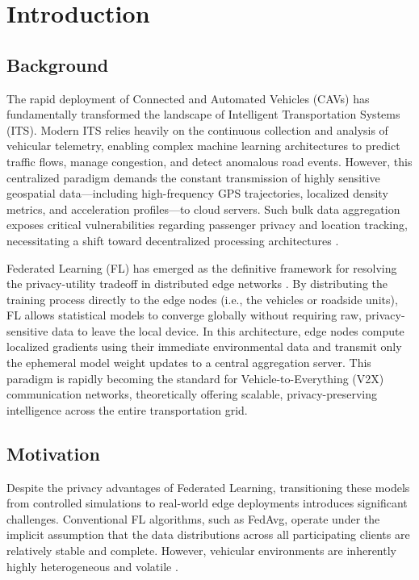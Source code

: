 \section{Introduction}

\subsection{Background}

The rapid deployment of Connected and Automated Vehicles (CAVs) has fundamentally transformed the landscape of Intelligent Transportation Systems (ITS). Modern ITS relies heavily on the continuous collection and analysis of vehicular telemetry, enabling complex machine learning architectures to predict traffic flows, manage congestion, and detect anomalous road events. However, this centralized paradigm demands the constant transmission of highly sensitive geospatial data---including high-frequency GPS trajectories, localized density metrics, and acceleration profiles---to cloud servers. Such bulk data aggregation exposes critical vulnerabilities regarding passenger privacy and location tracking, necessitating a shift toward decentralized processing architectures \cite{zhang2024federated_its}.

Federated Learning (FL) has emerged as the definitive framework for resolving the privacy-utility tradeoff in distributed edge networks \cite{mcmahan2017communication}. By distributing the training process directly to the edge nodes (i.e., the vehicles or roadside units), FL allows statistical models to converge globally without requiring raw, privacy-sensitive data to leave the local device. In this architecture, edge nodes compute localized gradients using their immediate environmental data and transmit only the ephemeral model weight updates to a central aggregation server. This paradigm is rapidly becoming the standard for Vehicle-to-Everything (V2X) communication networks, theoretically offering scalable, privacy-preserving intelligence across the entire transportation grid.

\subsection{Motivation}

Despite the privacy advantages of Federated Learning, transitioning these models from controlled simulations to real-world edge deployments introduces significant challenges. Conventional FL algorithms, such as FedAvg, operate under the implicit assumption that the data distributions across all participating clients are relatively stable and complete. However, vehicular environments are inherently highly heterogeneous and volatile \cite{zhao2018federated}.

